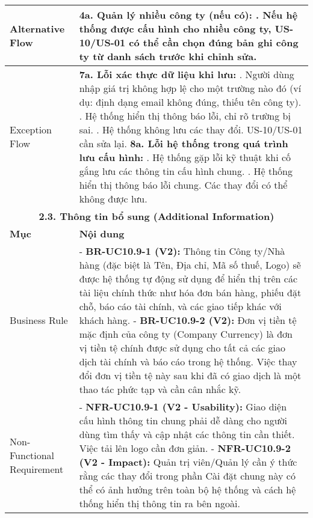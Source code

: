 \begin{longtable}{|m{4cm}|p{11cm}|}
\hline
Alternative Flow & \textbf{4a. Quản lý nhiều công ty (nếu có):} \newline    1. Nếu hệ thống được cấu hình cho nhiều công ty, US-10/US-01 có thể cần chọn đúng bản ghi công ty từ danh sách trước khi chỉnh sửa. \\
\hline
Exception Flow & \textbf{7a. Lỗi xác thực dữ liệu khi lưu:} \newline    1. Người dùng nhập giá trị không hợp lệ cho một trường nào đó (ví dụ: định dạng email không đúng, thiếu tên công ty). \newline    2. Hệ thống hiển thị thông báo lỗi, chỉ rõ trường bị sai. \newline    3. Hệ thống không lưu các thay đổi. US-10/US-01 cần sửa lại. \newline \textbf{8a. Lỗi hệ thống trong quá trình lưu cấu hình:} \newline    1. Hệ thống gặp lỗi kỹ thuật khi cố gắng lưu các thông tin cấu hình chung. \newline    2. Hệ thống hiển thị thông báo lỗi chung. Các thay đổi có thể không được lưu. \\
\hline
\multicolumn{2}{|c|}{\textbf{2.3. Thông tin bổ sung (Additional Information)}} \\
\hline
\textbf{Mục} & \textbf{Nội dung} \\
\hline
Business Rule & - \textbf{BR-UC10.9-1 (V2):} Thông tin Công ty/Nhà hàng (đặc biệt là Tên, Địa chỉ, Mã số thuế, Logo) sẽ được hệ thống tự động sử dụng để hiển thị trên các tài liệu chính thức như hóa đơn bán hàng, phiếu đặt chỗ, báo cáo tài chính, và các giao tiếp khác với khách hàng. \newline - \textbf{BR-UC10.9-2 (V2):} Đơn vị tiền tệ mặc định của công ty (Company Currency) là đơn vị tiền tệ chính được sử dụng cho tất cả các giao dịch tài chính và báo cáo trong hệ thống. Việc thay đổi đơn vị tiền tệ này sau khi đã có giao dịch là một thao tác phức tạp và cần cân nhắc kỹ. \\
\hline
Non-Functional Requirement & - \textbf{NFR-UC10.9-1 (V2 - Usability):} Giao diện cấu hình thông tin chung phải dễ dàng cho người dùng tìm thấy và cập nhật các thông tin cần thiết. Việc tải lên logo cần đơn giản. \newline - \textbf{NFR-UC10.9-2 (V2 - Impact):} Quản trị viên/Quản lý cần ý thức rằng các thay đổi trong phần Cài đặt chung này có thể có ảnh hưởng trên toàn bộ hệ thống và cách hệ thống hiển thị thông tin ra bên ngoài. \\
\hline
\end{longtable}


